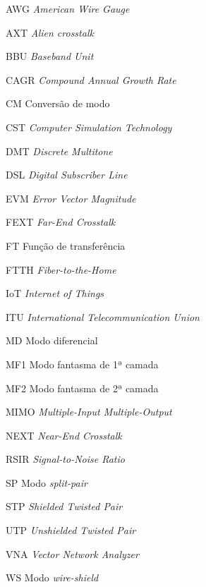 \documentclass[
	12pt,				%
	openright,			%
	oneside,			%
	a4paper,			%
	english,			%
	brazil				%
	]{abntex2}
\begin{document}
\begin{siglas}
 \item[AWG]\textit{American Wire Gauge}
 \item[AXT]\textit{Alien crosstalk} 
 \item[BBU]\textit{Baseband Unit}
 \item[CAGR]\textit{Compound Annual Growth Rate}
 \item[CM]Conversão de modo
 \item[CST]\textit{Computer Simulation Technology}
 \item[DMT]\textit{Discrete Multitone}
 \item[DSL]\textit{Digital Subscriber Line}
 \item[EVM]\textit{Error Vector Magnitude}
 \item[FEXT]\textit{Far-End Crosstalk}
 \item[FT]Função de transferência
 \item[FTTH]\textit{Fiber-to-the-Home}
 \item[IoT]\textit{Internet of Things}
 \item[ITU]\textit{International Telecommunication Union}
 \item[MD]Modo diferencial
 \item[MF1]Modo fantasma de 1ª camada 
 \item[MF2]Modo fantasma de 2ª camada
 \item[MIMO]\textit{Multiple-Input Multiple-Output}
 \item[NEXT]\textit{Near-End Crosstalk}
 \item[RSIR]\textit{Signal-to-Noise Ratio}
 \item[SP]Modo \textit{split-pair}
 \item[STP]\textit{Shielded Twisted Pair}
 \item[UTP]\textit{Unshielded Twisted Pair}
 \item[VNA]\textit{Vector Network Analyzer}
 \item[WS]Modo \textit{wire-shield}
\end{siglas}
\end{document}
